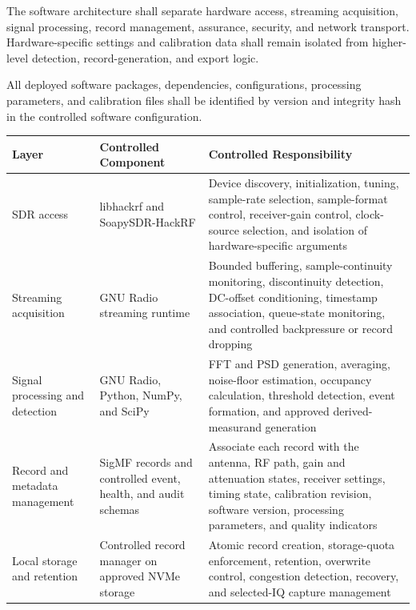 \documentclass[11pt,a4paper]{article}
\begin{document}
	The software architecture shall separate hardware access, streaming
	acquisition, signal processing, record management, assurance, security, and
	network transport. Hardware-specific settings and calibration data shall remain
	isolated from higher-level detection, record-generation, and export logic.
	
	All deployed software packages, dependencies, configurations, processing
	parameters, and calibration files shall be identified by version and integrity
	hash in the controlled software configuration.
	
	\begin{table}[htbp]
		\centering
		\small
		\renewcommand{\arraystretch}{1.2}
		\begin{tabularx}{\columnwidth}{
				>{\raggedright\arraybackslash}p{2.7cm}
				>{\raggedright\arraybackslash}p{3.8cm}
				>{\raggedright\arraybackslash}X}
			\toprule
			\textbf{Layer} &
			\textbf{Controlled Component} &
			\textbf{Controlled Responsibility} \\
			\midrule
			
			SDR access &
			libhackrf and SoapySDR-HackRF &
			Device discovery, initialization, tuning, sample-rate selection,
			sample-format control, receiver-gain control, clock-source selection,
			and isolation of hardware-specific arguments \\
			
			Streaming acquisition &
			GNU Radio streaming runtime &
			Bounded buffering, sample-continuity monitoring, discontinuity
			detection, DC-offset conditioning, timestamp association, queue-state
			monitoring, and controlled backpressure or record dropping \\
			
			Signal processing and detection &
			GNU Radio, Python, NumPy, and SciPy &
			FFT and PSD generation, averaging, noise-floor estimation, occupancy
			calculation, threshold detection, event formation, and approved
			derived-measurand generation \\
			
			Record and metadata management &
			SigMF records and controlled event, health, and audit schemas &
			Associate each record with the antenna, RF path, gain and attenuation
			states, receiver settings, timing state, calibration revision,
			software version, processing parameters, and quality indicators \\
			
			Local storage and retention &
			Controlled record manager on approved NVMe storage &
			Atomic record creation, storage-quota enforcement, retention,
			overwrite control, congestion detection, recovery, and selected-IQ
			capture management \\
			

\end{tabularx}
\end{table}
\end{document}
